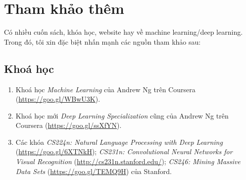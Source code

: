 \section{Tham khảo thêm}

Có nhiều cuốn sách, khóa học, website hay về machine learning/deep learning. Trong đó, tôi xin đặc biệt nhấn mạnh các nguồn tham khảo sau:

\subsection{Khoá học}
\begin{enumerate}
\item Khoá học \textit{Machine Learning} của Andrew Ng trên Coursera
(\url{https://goo.gl/WBwU3K}).

\item Khoá học mới \textit{Deep Learning Specialization} cũng của Andrew Ng
trên Coursera (\url{https://goo.gl/ssXfYN}).

\item Các khóa \textit{CS224n: Natural Language Processing with Deep
Learning} (\url{https://goo.gl/6XTNkH}); \textit{CS231n: Convolutional Neural
Networks for Visual Recognition} (\url{http://cs231n.stanford.edu/});
\textit{CS246: Mining Massive Data Sets} (\url{https://goo.gl/TEMQ9H}) của
Stanford.


\end{enumerate}


